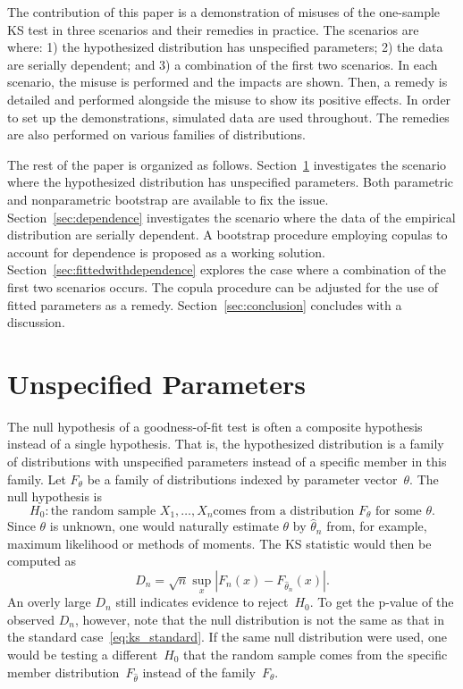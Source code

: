 \documentclass[12pt, letterpaper, titlepage]{article}
\begin{document}
The contribution of this paper is a demonstration of misuses of the one-sample
KS test in three scenarios and their remedies in practice. The scenarios are
where:
1) the hypothesized distribution has unspecified parameters;
2) the data are serially dependent; and
3) a combination of the first two scenarios.
In each scenario, the misuse is performed and the impacts are shown. Then, a
remedy is detailed and performed alongside the misuse to show its positive
effects. In order to set up the demonstrations, simulated data are used
throughout. The remedies are also performed on various families of
distributions.


The rest of the paper is organized as follows. Section~\ref{sec:fitted}
investigates the scenario where the hypothesized distribution has unspecified
parameters. Both parametric and nonparametric bootstrap are available to fix the
issue. Section~\ref{sec:dependence} investigates the scenario where the data of
the empirical distribution are serially dependent. A bootstrap procedure
employing copulas to account for dependence is proposed as a working solution.
Section~\ref{sec:fittedwithdependence}
explores the case where a combination of the first two scenarios occurs. The
copula procedure can be adjusted for the use of fitted parameters as a remedy.
Section~\ref{sec:conclusion} concludes with a discussion.

\section{Unspecified Parameters}
\label{sec:fitted}

The null hypothesis of a goodness-of-fit test is often a composite hypothesis
instead of a single hypothesis. That is, the hypothesized distribution is a
family of distributions with unspecified parameters instead of a specific member
in this family. Let $F_\theta$ be a family of distributions indexed by parameter
vector~$\theta$. The null hypothesis is
\[
  H_0: \text{the random sample $X_1, \ldots, X_n$
    comes from a distribution $F_\theta$ for some $\theta$.}
\]
Since $\theta$ is unknown, one would naturally estimate $\theta$ by
$\hat\theta_n$ from, for example, maximum likelihood or methods of moments. The
KS statistic would then be computed as
\begin{equation}
  \label{eq:ks_fitted}
  D_n = \sqrt{n} \sup_x | F_n(x) - F_{\hat\theta_n}(x) |.
\end{equation}
An overly large $D_n$ still indicates evidence to reject~$H_0$. To get the
p-value of the observed $D_n$, however, note that the null distribution is not
the same as that in the standard
case~\eqref{eq:ks_standard}. If the same null distribution were used, one would
be testing a different~$H_0$ that the random sample comes from the specific
member distribution~$F_{\hat\theta}$ instead of the family~$F_\theta$.
\end{document}
